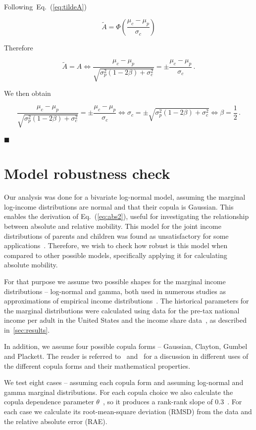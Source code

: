 \documentclass[12pt,a4paper]{article}
\newcommand*{\qed}{\hfill\ensuremath{\blacksquare}}%
\newcommand{\eref}[1]{Eq.~(\ref{eq:#1})}
\newcommand{\be}{\begin{equation}}
\newcommand{\ee}{\end{equation}}
\numberwithin{equation}{section}
\begin{document}
Following~\eref{tildeA}

\be
\tilde{A} = \Phi\left(\frac{\mu_c-\mu_p}{\sigma_c} \right)
\ee

Therefore

\be
\tilde{A}=A \iff \frac{\mu_c - \mu_p}{\sqrt{\sigma_p^2\left(1 - 2\beta\right) + \sigma_c^2}} = \pm\frac{\mu_c-\mu_p}{\sigma_c}\,.
\ee

We then obtain

\be
\frac{\mu_c - \mu_p}{\sqrt{\sigma_p^2\left(1 - 2\beta\right) + \sigma_c^2}} = \pm\frac{\mu_c-\mu_p}{\sigma_c} \iff \sigma_c = \pm\sqrt{\sigma_p^2\left(1 - 2\beta\right) + \sigma_c^2} \iff \beta = \frac{1}{2}\,.
\ee

\qed

\section{Model robustness check}
\label{app:appB}

Our analysis was done for a bivariate log-normal model, assuming the marginal log-income distributions are normal and that their copula is Gaussian. This enables the derivation of \eref{abs2}, useful for investigating the relationship between absolute and relative mobility. This model for the joint income distributions of parents and children was found as unsatisfactory for some applications~\citep{bonhomme2009assessing}. Therefore, we wish to check how robust is this model when compared to other possible models, specifically applying it for calculating absolute mobility.

For that purpose we assume two possible shapes for the marginal income distributions -- log-normal and gamma, both used in numerous studies as approximations of empirical income distributions~\citep{salem1974convenient,pinkovskiy2009parametric}. The historical parameters for the marginal distributions were calculated using data for the pre-tax national income per adult in the United States and the income share data~\citep{WID2017}, as described in~\ref{sec:results}.

In addition, we assume four possible copula forms -- Gaussian, Clayton, Gumbel and Plackett. The reader is referred to~\citet{trivedi2007copula} and~\citet{bonhomme2009assessing} for a discussion in different uses of the different copula forms and their mathematical properties.

We test eight cases -- assuming each copula form and assuming log-normal and gamma marginal distributions. For each copula choice we also calculate the copula dependence parameter $\theta$~\citep{trivedi2007copula}, so it produces a rank-rank slope of $0.3$~\citep{chetty2014land}. For each case we calculate its root-mean-square deviation (RMSD) from the data and the relative absolute error (RAE).
\end{document}
